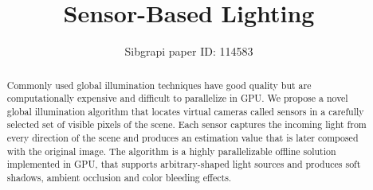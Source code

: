\documentclass[10pt, conference]{IEEEtran}
\begin{document}
%
\title{Sensor-Based Lighting}

\newif\iffinal
\finalfalse
\newcommand{\jemsid}{114583}


\iffinal
  \author{%
    \IEEEauthorblockN{Mariano M. Banquiero, Matias N. Leone,}
    \IEEEauthorblockA{%
      Explotaci{\'o}n de GPUs y Gr{\'a}ficos Por Computadora - GIGC\\
      Departamento de Ingenier{\'i}a en Sistemas de Informaci{\'o}n, Universidad Tecnol{\'o}gica Nacional\\
      Buenos Aires, Argentina\\
      Email: \{mbanquiero, mleone\}@frba.utn.edu.ar}
  
  }
\else
  \author{Sibgrapi paper ID: \jemsid \\ }
\fi







\maketitle


\begin{abstract}
Commonly used global illumination techniques have good quality but are computationally expensive and difficult to parallelize in GPU.
We propose a novel global illumination algorithm that locates virtual cameras called sensors in a carefully selected set of visible pixels of the scene. 
Each sensor captures the incoming light from every direction of the scene and produces an estimation value that is later composed with the original image. 
The algorithm is a highly parallelizable offline solution implemented in GPU, that supports arbitrary-shaped light sources and produces soft shadows, ambient occlusion and color bleeding effects.


%
\end{abstract}
\end{document}
